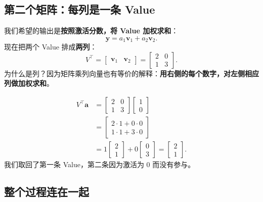 \documentclass[11pt,a4paper,UTF8]{ctexart}
\numberwithin{equation}{section}
\newcommand{\vect}[1]{\boldsymbol{#1}}
\begin{document}
\subsection{第二个矩阵：每列是一条 Value}

我们希望的输出是\textbf{按照激活分数，将 Value 加权求和}：
\begin{equation}
\vect{y}=a_1\vect{v}_1+a_2\vect{v}_2.
\end{equation}
现在把两个 Value 排成\textbf{两列}：
\begin{equation}
V^\top=
\begin{bmatrix}
\vect{v}_1&\vect{v}_2
\end{bmatrix}
=
\begin{bmatrix}
2&0\\
1&3
\end{bmatrix}.
\end{equation}
为什么是列？因为矩阵乘列向量也有等价的解释：\textbf{用右侧的每个数字，对左侧相应列做加权求和}。

\begin{example}[title={矩阵乘向量 = 按列加权求和}]
\begin{align*}
V^\top\vect{a}
&=\begin{bmatrix}2&0\\1&3\end{bmatrix}
  \begin{bmatrix}1\\0\end{bmatrix}\\
&=\begin{bmatrix}2\cdot1+0\cdot0\\1\cdot1+3\cdot0\end{bmatrix}\\
&=1\begin{bmatrix}2\\1\end{bmatrix}
 +0\begin{bmatrix}0\\3\end{bmatrix}
=\boxed{\begin{bmatrix}2\\1\end{bmatrix}}.
\end{align*}
我们取回了第一条 Value，第二条因为激活为 $0$ 而没有参与。
\end{example}

\subsection{整个过程连在一起}
\end{document}
